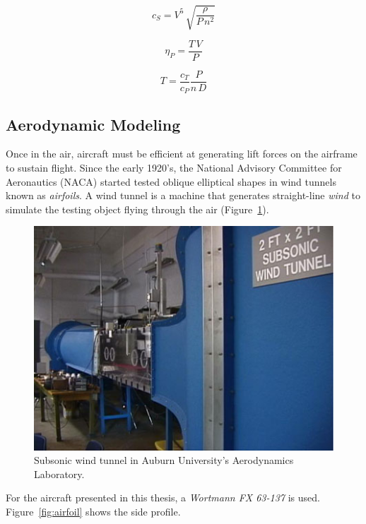 \documentclass[12pt]{report}
\begin{document}
\begin{equation}\label{eq:speedpowercoefficient}
  c_S = V^5 \, \sqrt{\frac{\rho}{P \, n^2}}
\end{equation}



\begin{equation}\label{eq:propellerefficiency}
  \eta_P = \frac{T \, V}{P}
\end{equation}

\begin{equation}\label{eq:thrust}
  T = \frac{c_T}{c_P} \frac{P}{n \, D}
\end{equation}



\clearpage
\subsection{Aerodynamic Modeling}\label{section:aerodynamic}
Once in the air, aircraft must be efficient at generating lift forces on the airframe to sustain flight. Since the early 1920's, the National Advisory Committee for Aeronautics (NACA) started tested oblique elliptical shapes in wind tunnels known as \textit{airfoils}. A wind tunnel is a machine that generates straight-line \textit{wind} to simulate the testing object flying through the air (Figure~\ref{fig:windtunnel}).

\begin{figure}[!ht]\label{fig:windtunnel}
  \centering
  \includegraphics[width=.75\linewidth]{Figures/opencircuitwindtunnel.jpg}
  \caption{Subsonic wind tunnel in Auburn University's Aerodynamics Laboratory.}
\end{figure}

For the aircraft presented in this thesis, a \textit{Wortmann FX 63{-}137} is used. Figure~\ref{fig:airfoil} shows the side profile.
\end{document}
